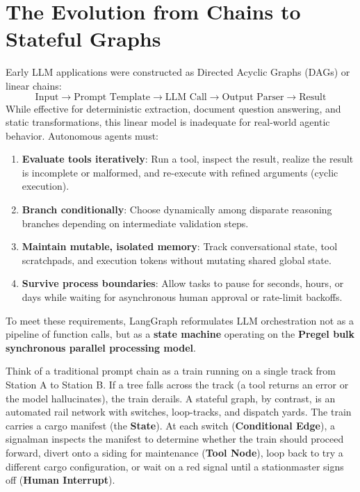 \section{The Evolution from Chains to Stateful Graphs}

Early LLM applications were constructed as Directed Acyclic Graphs (DAGs) or linear chains:
\begin{equation}
\text{Input} \longrightarrow \text{Prompt Template} \longrightarrow \text{LLM Call} \longrightarrow \text{Output Parser} \longrightarrow \text{Result}
\end{equation}
While effective for deterministic extraction, document question answering, and static transformations, this linear model is inadequate for real-world agentic behavior. Autonomous agents must:
\begin{enumerate}[leftmargin=18pt]
  \item \textbf{Evaluate tools iteratively}: Run a tool, inspect the result, realize the result is incomplete or malformed, and re-execute with refined arguments (cyclic execution).
  \item \textbf{Branch conditionally}: Choose dynamically among disparate reasoning branches depending on intermediate validation steps.
  \item \textbf{Maintain mutable, isolated memory}: Track conversational state, tool scratchpads, and execution tokens without mutating shared global state.
  \item \textbf{Survive process boundaries}: Allow tasks to pause for seconds, hours, or days while waiting for asynchronous human approval or rate-limit backoffs.
\end{enumerate}

To meet these requirements, LangGraph reformulates LLM orchestration not as a pipeline of function calls, but as a \textbf{state machine} operating on the \textbf{Pregel bulk synchronous parallel processing model}.

\begin{intuitionbox}
Think of a traditional prompt chain as a train running on a single track from Station A to Station B. If a tree falls across the track (a tool returns an error or the model hallucinates), the train derails. 
A stateful graph, by contrast, is an automated rail network with switches, loop-tracks, and dispatch yards. The train carries a cargo manifest (the \textbf{State}). At each switch (\textbf{Conditional Edge}), a signalman inspects the manifest to determine whether the train should proceed forward, divert onto a siding for maintenance (\textbf{Tool Node}), loop back to try a different cargo configuration, or wait on a red signal until a stationmaster signs off (\textbf{Human Interrupt}).
\end{intuitionbox}

